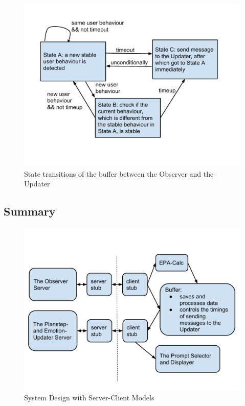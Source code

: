 \begin{figure}[p]
\centering
\includegraphics[width=\linewidth]{fig-state-trans.pdf}
\caption{State transitions of the buffer between the Observer and the Updater}
\label{fig:state-trans}
\end{figure}

\subsection{Summary}

\begin{figure}[p]
\centering
\includegraphics[width=\linewidth]{fig-system.pdf}
\caption{System Design with Server-Client Models}
\label{fig:system}
\end{figure}

